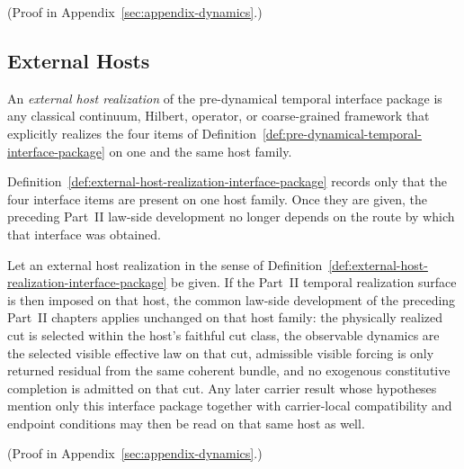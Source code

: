 (Proof in Appendix~\ref{sec:appendix-dynamics}.)

\subsection{External Hosts}

\begin{definition}
\label{def:external-host-realization-interface-package}
An \emph{external host realization} of the pre-dynamical temporal interface
package is any classical continuum, Hilbert, operator, or coarse-grained
framework that explicitly realizes the four items of
Definition~\ref{def:pre-dynamical-temporal-interface-package} on one and the
same host family.
\end{definition}

Definition~\ref{def:external-host-realization-interface-package} records only
that the four interface items are present on one host family. Once they are
given, the preceding Part~II law-side development no longer depends on the
route by which that interface was obtained.

\begin{corollary}
\label{cor:portability-of-temporal-realization-and-common-grammar}
Let an external host realization in the sense of
Definition~\ref{def:external-host-realization-interface-package} be given. If
the Part~II temporal realization surface is then imposed on that host, the
common law-side development of the preceding Part~II chapters applies
unchanged on that host family: the physically realized cut is selected within
the host's faithful cut class, the observable dynamics are the selected
visible effective law on that cut, admissible visible forcing is only
returned residual from the same coherent bundle, and no exogenous constitutive
completion is admitted on that cut. Any later carrier result whose hypotheses
mention only this interface package together with carrier-local compatibility
and endpoint conditions may then be read on that same host as well.
\end{corollary}

(Proof in Appendix~\ref{sec:appendix-dynamics}.)

